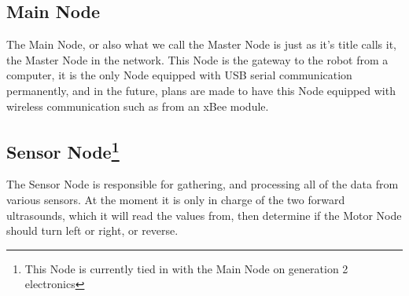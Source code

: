 \documentclass{article}
\begin{document}
\subsection{Main Node}
The Main Node, or also what we call the Master Node is just as it's title calls it, the Master Node in the network. This Node is the gateway to the robot from a computer, it is the only Node equipped with USB serial communication permanently, and in the future, plans are made to have this Node equipped with wireless communication such as from an xBee module.\\
\subsection{Sensor Node\footnote{This Node is currently tied in with the Main Node on generation 2 electronics}}
The Sensor Node is responsible for gathering, and processing all of the data from various sensors. At the moment it is only in charge of the two forward ultrasounds, which it will read the values from, then determine if the Motor Node should turn left or right, or reverse.\\
\end{document}
